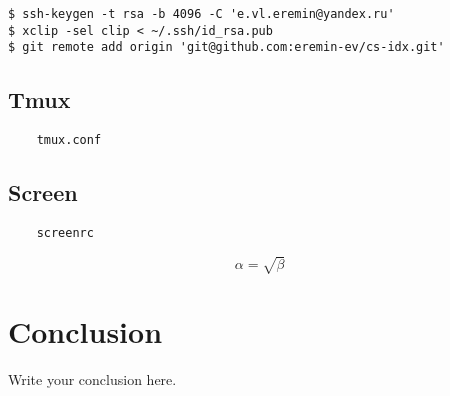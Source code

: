 \documentclass{article}
\begin{document}
\begin{verbatim}
$ ssh-keygen -t rsa -b 4096 -C 'e.vl.eremin@yandex.ru'
$ xclip -sel clip < ~/.ssh/id_rsa.pub
$ git remote add origin 'git@github.com:eremin-ev/cs-idx.git'
\end{verbatim}

\subsection{Tmux}

\begin{verbatim}
	tmux.conf
\end{verbatim}

\subsection{Screen}

\begin{verbatim}
	screenrc
\end{verbatim}

\begin{equation}
    \label{simple_equation}
    \alpha = \sqrt{\beta}
\end{equation}

\section{Conclusion}

Write your conclusion here.
\end{document}
